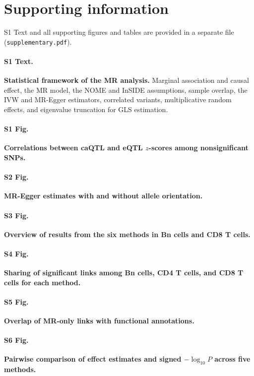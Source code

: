 \section*{Supporting information}
S1 Text and all supporting figures and tables are provided in a separate file
(\texttt{supplementary.pdf}).

\paragraph*{S1 Text.}
\label{S1_Text}
\textbf{Statistical framework of the MR analysis.} Marginal association and causal effect, the MR model, the NOME and InSIDE assumptions, sample overlap, the IVW and MR-Egger estimators, correlated variants, multiplicative random effects, and eigenvalue truncation for GLS estimation.

\paragraph*{S1 Fig.}
\label{S1_Fig}
\textbf{Correlations between caQTL and eQTL $z$-scores among nonsignificant SNPs.}

\paragraph*{S2 Fig.}
\label{S2_Fig}
\textbf{MR-Egger estimates with and without allele orientation.}

\paragraph*{S3 Fig.}
\label{S3_Fig}
\textbf{Overview of results from the six methods in Bn cells and CD8 T cells.}

\paragraph*{S4 Fig.}
\label{S4_Fig}
\textbf{Sharing of significant links among Bn cells, CD4 T cells, and CD8 T cells for each method.}

\paragraph*{S5 Fig.}
\label{S5_Fig}
\textbf{Overlap of MR-only links with functional annotations.}

\paragraph*{S6 Fig.}
\label{S6_Fig}
\textbf{Pairwise comparison of effect estimates and signed $-\log_{10}P$ across five methods.}

